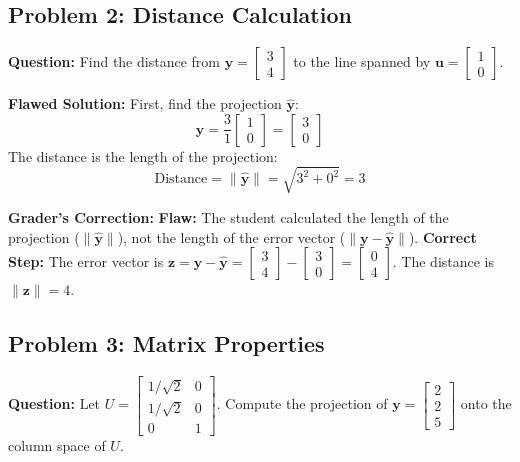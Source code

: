 \documentclass[11pt, letterpaper]{article}
\theoremstyle{definition}
\theoremstyle{remark}
\begin{document}
\subsection{Problem 2: Distance Calculation}
\textbf{Question:} Find the distance from $\mathbf{y} = \begin{bmatrix} 3 \\ 4 \end{bmatrix}$ to the line spanned by $\mathbf{u} = \begin{bmatrix} 1 \\ 0 \end{bmatrix}$.

\textbf{Flawed Solution:}
First, find the projection $\hat{\mathbf{y}}$:
\[ \hat{\mathbf{y}} = \frac{3}{1}\begin{bmatrix} 1 \\ 0 \end{bmatrix} = \begin{bmatrix} 3 \\ 0 \end{bmatrix} \]
The distance is the length of the projection:
\[ \text{Distance} = \|\hat{\mathbf{y}}\| = \sqrt{3^2 + 0^2} = 3 \]

\textbf{Grader's Correction:}
\textbf{Flaw:} The student calculated the length of the projection ($\|\hat{\mathbf{y}}\|$), not the length of the error vector ($\|\mathbf{y} - \hat{\mathbf{y}}\|$).
\textbf{Correct Step:} The error vector is $\mathbf{z} = \mathbf{y} - \hat{\mathbf{y}} = \begin{bmatrix} 3 \\ 4 \end{bmatrix} - \begin{bmatrix} 3 \\ 0 \end{bmatrix} = \begin{bmatrix} 0 \\ 4 \end{bmatrix}$. The distance is $\|\mathbf{z}\| = 4$.

\subsection{Problem 3: Matrix Properties}
\textbf{Question:} Let $U = \begin{bmatrix} 1/\sqrt{2} & 0 \\ 1/\sqrt{2} & 0 \\ 0 & 1 \end{bmatrix}$. Compute the projection of $\mathbf{y} = \begin{bmatrix} 2 \\ 2 \\ 5 \end{bmatrix}$ onto the column space of $U$.
\end{document}
